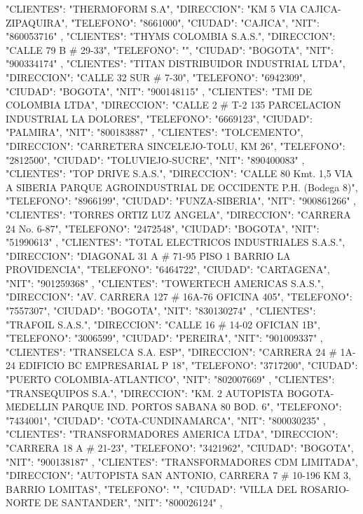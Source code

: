    {
   "CLIENTES": "THERMOFORM S.A",
   "DIRECCION": "KM 5 VIA CAJICA-ZIPAQUIRA",
   "TELEFONO": "8661000",
   "CIUDAD": "CAJICA",
   "NIT": "860053716"
   },
   {
   "CLIENTES": "THYMS COLOMBIA S.A.S.",
   "DIRECCION": "CALLE 79 B # 29-33",
   "TELEFONO": "",
   "CIUDAD": "BOGOTA",
   "NIT": "900334174"
   },
   {
   "CLIENTES": "TITAN DISTRIBUIDOR INDUSTRIAL LTDA",
   "DIRECCION": "CALLE 32 SUR # 7-30",
   "TELEFONO": "6942309",
   "CIUDAD": "BOGOTA",
   "NIT": "900148115"
   },
   {
   "CLIENTES": "TMI DE COLOMBIA LTDA",
   "DIRECCION": "CALLE 2 # T-2 135 PARCELACION INDUSTRIAL LA DOLORES",
   "TELEFONO": "6669123",
   "CIUDAD": "PALMIRA",
   "NIT": "800183887"
   },
   {
   "CLIENTES": "TOLCEMENTO",
   "DIRECCION": "CARRETERA SINCELEJO-TOLU, KM 26",
   "TELEFONO": "2812500",
   "CIUDAD": "TOLUVIEJO-SUCRE",
   "NIT": "890400083"
   },
   {
   "CLIENTES": "TOP DRIVE S.A.S.",
   "DIRECCION": "CALLE 80 Kmt. 1,5 VIA A SIBERIA PARQUE AGROINDUSTRIAL DE OCCIDENTE P.H. (Bodega 8)",
   "TELEFONO": "8966199",
   "CIUDAD": "FUNZA-SIBERIA",
   "NIT": "900861266"
   },
   {
   "CLIENTES": "TORRES ORTIZ LUZ ANGELA",
   "DIRECCION": "CARRERA 24 No. 6-87",
   "TELEFONO": "2472548",
   "CIUDAD": "BOGOTA",
   "NIT": "51990613"
   },
   {
   "CLIENTES": "TOTAL ELECTRICOS INDUSTRIALES S.A.S.",
   "DIRECCION": "DIAGONAL 31 A # 71-95 PISO 1 BARRIO LA PROVIDENCIA",
   "TELEFONO": "6464722",
   "CIUDAD": "CARTAGENA",
   "NIT": "901259368"
   },
   {
   "CLIENTES": "TOWERTECH AMERICAS S.A.S.",
   "DIRECCION": "AV. CARRERA 127 # 16A-76 OFICINA 405",
   "TELEFONO": "7557307",
   "CIUDAD": "BOGOTA",
   "NIT": "830130274"
   },
   {
   "CLIENTES": "TRAFOIL S.A.S.",
   "DIRECCION": "CALLE 16 # 14-02 OFICIAN 1B",
   "TELEFONO": "3006599",
   "CIUDAD": "PEREIRA",
   "NIT": "901009337"
   },
   {
   "CLIENTES": "TRANSELCA S.A. ESP",
   "DIRECCION": "CARRERA 24 # 1A-24 EDIFICIO BC EMPRESARIAL P 18",
   "TELEFONO": "3717200",
   "CIUDAD": "PUERTO COLOMBIA-ATLANTICO",
   "NIT": "802007669"
   },
   {
   "CLIENTES": "TRANSEQUIPOS S.A.",
   "DIRECCION": "KM. 2 AUTOPISTA BOGOTA-MEDELLIN PARQUE IND. PORTOS SABANA 80 BOD. 6",
   "TELEFONO": "7434001",
   "CIUDAD": "COTA-CUNDINAMARCA",
   "NIT": "800030235"
   },
   {
   "CLIENTES": "TRANSFORMADORES AMERICA LTDA",
   "DIRECCION": "CARRERA 18 A # 21-23",
   "TELEFONO": "3421962",
   "CIUDAD": "BOGOTA",
   "NIT": "900138187"
   },
   {
   "CLIENTES": "TRANSFORMADORES CDM LIMITADA",
   "DIRECCION": "AUTOPISTA SAN ANTONIO, CARRERA 7 # 10-196 KM 3, BARRIO LOMITAS",
   "TELEFONO": "",
   "CIUDAD": "VILLA DEL ROSARIO-NORTE DE SANTANDER",
   "NIT": "800026124"
   },
